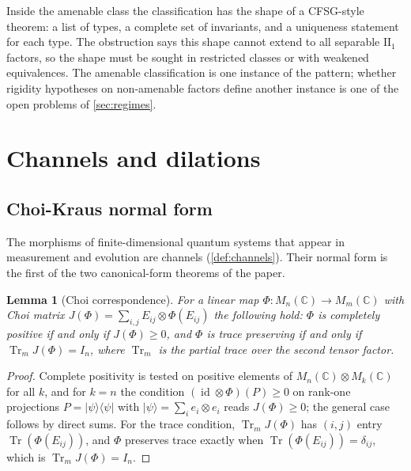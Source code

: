 \documentclass[11pt,letterpaper]{article}
\newtheorem{lemma}[theorem]{Lemma}
\theoremstyle{definition}
\theoremstyle{remark}
\begin{document}
Inside the amenable class the classification has the shape of a CFSG-style theorem: a list of types, a complete set of invariants, and a uniqueness statement for each type. The obstruction says this shape cannot extend to all separable $\mathrm{II}_1$ factors, so the shape must be sought in restricted classes or with weakened equivalences. The amenable classification is one instance of the pattern; whether rigidity hypotheses on non-amenable factors define another instance is one of the open problems of \cref{sec:regimes}.

\section{Channels and dilations}
\label{sec:channels}


\subsection{Choi-Kraus normal form}

The morphisms of finite-dimensional quantum systems that appear in measurement and evolution are channels (\cref{def:channels}). Their normal form is the first of the two canonical-form theorems of the paper.

\begin{lemma}[Choi correspondence]
\label{lem:choi}
For a linear map $\Phi: M_n(\mathbb{C}) \to M_m(\mathbb{C})$ with Choi matrix $J(\Phi) = \sum_{i,j} E_{ij} \otimes \Phi(E_{ij})$ the following hold: $\Phi$ is completely positive if and only if $J(\Phi) \geq 0$, and $\Phi$ is trace preserving if and only if $\operatorname{Tr}_m J(\Phi) = I_n$, where $\operatorname{Tr}_m$ is the partial trace over the second tensor factor.
\end{lemma}

\begin{proof}
Complete positivity is tested on positive elements of $M_n(\mathbb{C}) \otimes M_k(\mathbb{C})$ for all $k$, and for $k = n$ the condition $(\operatorname{id} \otimes \Phi)(P) \geq 0$ on rank-one projections $P = |\psi\rangle\langle\psi|$ with $|\psi\rangle = \sum_i e_i \otimes e_i$ reads $J(\Phi) \geq 0$; the general case follows by direct sums. For the trace condition, $\operatorname{Tr}_m J(\Phi)$ has $(i,j)$ entry $\operatorname{Tr}(\Phi(E_{ij}))$, and $\Phi$ preserves trace exactly when $\operatorname{Tr}(\Phi(E_{ij})) = \delta_{ij}$, which is $\operatorname{Tr}_m J(\Phi) = I_n$.
\end{proof}
\end{document}
